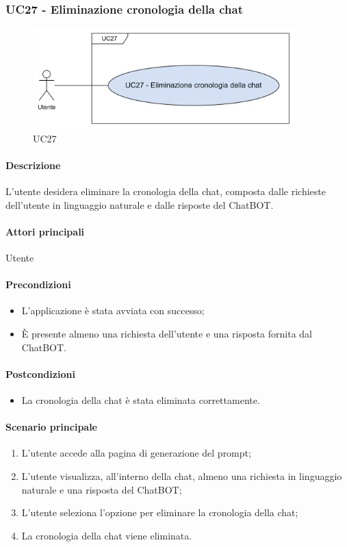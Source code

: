 \subsubsection{UC27 - Eliminazione cronologia della chat}\label{UC27}

\begin{figure}[H]
  \centering
  \includegraphics[width=0.90\textwidth]{assets/uc27.png}
  \caption{UC27}
\end{figure}

\paragraph*{Descrizione}
L'utente desidera eliminare la cronologia della chat, composta dalle richieste dell'utente in linguaggio naturale e dalle risposte del ChatBOT.

\paragraph*{Attori principali}
Utente

\paragraph*{Precondizioni}
\begin{itemize}
  \item L'applicazione è stata avviata con successo;
  \item È presente almeno una richiesta dell'utente e una risposta fornita dal ChatBOT.
\end{itemize}

\paragraph*{Postcondizioni}
\begin{itemize}
  \item La cronologia della chat è stata eliminata correttamente.
\end{itemize}

\paragraph*{Scenario principale}
\begin{enumerate}
  \item L'utente accede alla pagina di generazione del prompt;
  \item L'utente visualizza, all'interno della chat, almeno una richiesta in linguaggio naturale e una risposta del ChatBOT;
  \item L'utente seleziona l'opzione per eliminare la cronologia della chat;
  \item La cronologia della chat viene eliminata.
\end{enumerate}

